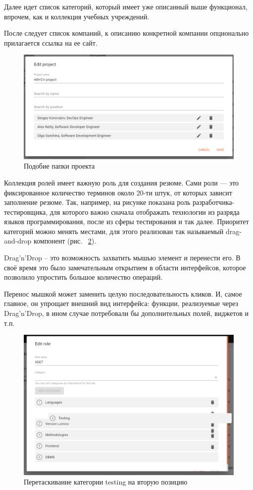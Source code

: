 \documentclass[12pt, a4paper]{diplom}
\begin{document}
Далее идет список категорий, который имеет уже описанный выше функционал, впрочем, как и коллекция учебных учреждений.

После следует список компаний, к описанию конкретной компании опционально прилагается ссылка на ее сайт.

\begin{figure}[!ht]
\centering
\includegraphics[width=1\textwidth]{resources/editProject.png}
\caption{Подобие папки проекта}
\label{18}
\end{figure}

Коллекция ролей имеет важную роль для создания резюме. Сами роли — это фиксированное количество терминов около 20-ти штук, от которых зависит заполнение резюме.
Так, например, на рисунке показана роль разработчика-тестировщика, для которого важно сначала отображать технологии из разряда языков программирования, после из сферы тестирования и так далее.
Приоритет категорий можно менять местами, для этого реализован так называемый drag-and-drop компонент (рис. ~\ref{19}).

Drag’n’Drop – это возможность захватить мышью элемент и перенести его. В своё время это было замечательным открытием в области интерфейсов, которое позволило упростить большое количество операций.

Перенос мышкой может заменить целую последовательность кликов. И, самое главное, он упрощает внешний вид интерфейса: функции, реализуемые через Drag’n’Drop, в ином случае потребовали бы дополнительных полей, виджетов и т.п.

\begin{figure}[!ht]
\centering
\includegraphics[width=1\textwidth]{resources/roles.png}
\caption{Перетаскивание категории testing на вторую позицию}
\label{19}
\end{figure}
\end{document}
